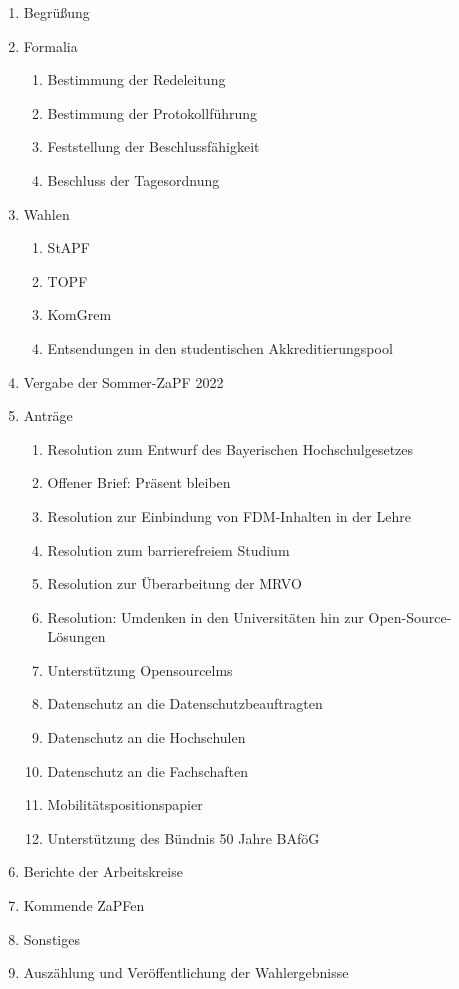 \documentclass[compress, aspectratio=169]{beamer}
\begin{document}
\begin{frame}[plain]
\begin{multicols}{2}
    \begin{enumerate}\footnotesize
        \item Begrüßung
	\item Formalia
	\begin{enumerate}
            \item \footnotesize Bestimmung der Redeleitung
            \item Bestimmung der Protokollführung
            \item Feststellung der Beschlussfähigkeit
            \item Beschluss der Tagesordnung
        \end{enumerate}

	\item Wahlen
	\begin{enumerate}
            \item \footnotesize StAPF
            \item TOPF
            \item KomGrem
	    \item Entsendungen in den studentischen Akkreditierungspool
        \end{enumerate}
	\item Vergabe der Sommer-ZaPF 2022
        \item Anträge
	\begin{enumerate}
            \item \footnotesize Resolution zum Entwurf des Bayerischen Hochschulgesetzes
            \item Offener Brief: Präsent bleiben
            \item Resolution zur Einbindung von FDM-Inhalten in der Lehre
            \item Resolution zum barrierefreiem Studium
            \item Resolution zur Überarbeitung der MRVO
            \item Resolution: Umdenken in den Universitäten hin zur Open-Source-Lösungen
            \item Unterstützung Opensourcelms
            \item Datenschutz an die Datenschutzbeauftragten
            \item Datenschutz an die Hochschulen
            \item Datenschutz an die Fachschaften
            \item Mobilitätspositionspapier
            \item Unterstützung des Bündnis 50 Jahre BAföG
        
        \end{enumerate}
	\item Berichte der Arbeitskreise
	\item Kommende ZaPFen
    \item Sonstiges
	\item Auszählung und Veröffentlichung der Wahlergebnisse
    \end{enumerate}
\end{multicols}
\end{frame}
\end{document}

